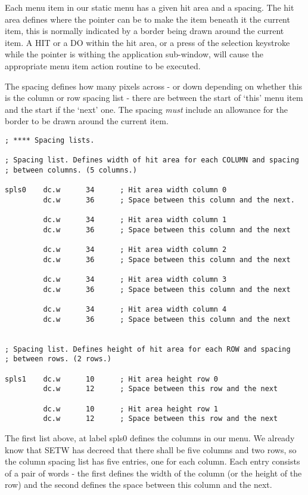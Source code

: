Each menu item in our static menu has a given hit area and a
    spacing. The hit area defines where the pointer can be to make the item
    beneath it the current item, this is normally indicated by a border being
    drawn around the current item. A HIT or a DO within the hit area, or a
    press of the selection keystroke while the pointer is withing the
    application sub-{}window, will cause the appropriate menu item action
    routine to be executed.

The spacing defines how many pixels across -{} or down depending on
    whether this is the column or row spacing list -{} there are between the
    start of `this' menu item and the start if the `next' one. The spacing
 \emph{must} include an allowance for the border to be drawn
    around the current item.

\begin{lstlisting}[firstnumber=42,caption={AppMenuTest1Win\_asm - Spacing Lists}]
; **** Spacing lists.

; Spacing list. Defines width of hit area for each COLUMN and spacing
; between columns. (5 columns.)

spls0    dc.w      34      ; Hit area width column 0
         dc.w      36      ; Space between this column and the next.

         dc.w      34      ; Hit area width column 1
         dc.w      36      ; Space between this column and the next

         dc.w      34      ; Hit area width column 2
         dc.w      36      ; Space between this column and the next

         dc.w      34      ; Hit area width column 3
         dc.w      36      ; Space between this column and the next

         dc.w      34      ; Hit area width column 4
         dc.w      36      ; Space between this column and the next


; Spacing list. Defines height of hit area for each ROW and spacing
; between rows. (2 rows.)

spls1    dc.w      10      ; Hit area height row 0
         dc.w      12      ; Space between this row and the next

         dc.w      10      ; Hit area height row 1
         dc.w      12      ; Space between this row and the next
\end{lstlisting}

The first list above, at label spls0 defines the columns in our
    menu. We already know that SETW has decreed
    that there shall be five columns and two rows, so the column spacing list
    has five entries, one for each column. Each entry consists of a pair of
    words -{} the first defines the width of the column (or the height of the
    row) and the second defines the space between this column and the
    next.

